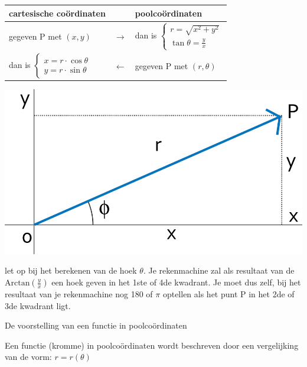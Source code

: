\begin{minipage}{.48\linewidth}
	\begin{tabular}{lcl}
		cartesische co\"ordinaten &  & poolco\"ordinaten  \\
		\hline
		gegeven P met $\left(x,y\right)$ & $\rightarrow$ & dan is $\begin{cases}
		r=\sqrt{x^{2}+y^{2}}\\
		\tan\theta=\frac{y}{x}
		\end{cases}$  \\
		dan is $\begin{cases}
		x=r\cdot\cos\theta\\
		y=r\cdot\sin\theta
		\end{cases}$ & $\leftarrow$ & gegeven P met $\left(r,\theta\right)$ \\
	\end{tabular}
\end{minipage}
\hspace{1cm}
\begin{minipage}{.48\linewidth}
	\centering
	\includegraphics[width=0.7\linewidth]{2_elem_rekenvaardigheden_B/inputs/figuur9}
\end{minipage}

\vspace{1cm}

\begin{opmerking}
let op bij het berekenen van de hoek $\theta$. Je rekenmachine
zal als resultaat van de $\textrm{Arctan}\left(\frac{y}{x}\right)$
een hoek geven in het 1ste of 4de kwadrant. Je moet dus zelf, bij
het resultaat van je rekenmachine nog 180\textdegree{} of $\pi$ optellen
als het punt P in het 2de of 3de kwadrant ligt.
\end{opmerking}

De voorstelling van een functie in poolco\"ordinaten

Een functie (kromme) in poolco\"ordinaten wordt beschreven
door een vergelijking van de vorm: $r=r(\theta)$


